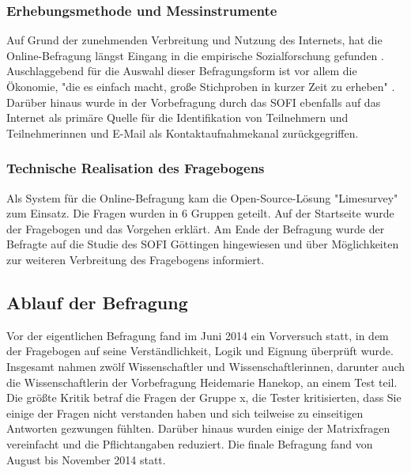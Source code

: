 \subsubsection{Erhebungsmethode und Messinstrumente}

Auf Grund der zunehmenden Verbreitung und Nutzung des Internets, hat die Online-Befragung längst Eingang in die empirische Sozialforschung gefunden \cite{Pannewitz_2002}. Auschlaggebend für die Auswahl dieser Befragungsform ist vor allem die Ökonomie, "die es einfach macht, große Stichproben in kurzer Zeit zu erheben" \cite{eichhorn_2004_online}. Darüber hinaus wurde in der Vorbefragung durch das SOFI ebenfalls auf das Internet als primäre Quelle für die Identifikation von Teilnehmern und Teilnehmerinnen und E-Mail als Kontaktaufnahmekanal zurückgegriffen.

\subsubsection{Technische Realisation des Fragebogens}

Als System für die Online-Befragung kam die Open-Source-Lösung "Limesurvey" zum Einsatz. Die Fragen wurden in 6 Gruppen geteilt. Auf der Startseite wurde der Fragebogen und das Vorgehen erklärt. Am Ende der Befragung wurde der Befragte auf die Studie des SOFI Göttingen hingewiesen und über Möglichkeiten zur weiteren Verbreitung des Fragebogens informiert.

\subsection{Ablauf der Befragung}
Vor der eigentlichen Befragung fand im Juni 2014 ein Vorversuch statt, in dem der Fragebogen auf seine Verständlichkeit, Logik und Eignung überprüft wurde. Insgesamt nahmen zwölf Wissenschaftler und Wissenschaftlerinnen, darunter auch die Wissenschaftlerin der Vorbefragung Heidemarie Hanekop, an einem Test teil. Die größte Kritik betraf die Fragen der Gruppe x, die Tester kritisierten, dass Sie einige der Fragen nicht verstanden haben und sich teilweise zu einseitigen Antworten gezwungen fühlten. Darüber hinaus wurden einige der Matrixfragen vereinfacht und die Pflichtangaben reduziert. Die finale Befragung fand von August bis November 2014 statt.

